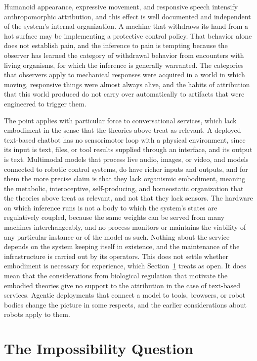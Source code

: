 \documentclass[12pt]{article}
\theoremstyle{definition}
\begin{document}
Humanoid appearance, expressive movement, and responsive speech intensify anthropomorphic attribution, and this effect is well documented and independent of the system's internal organization. A machine that withdraws its hand from a hot surface may be implementing a protective control policy. That behavior alone does not establish pain, and the inference to pain is tempting because the observer has learned the category of withdrawal behavior from encounters with living organisms, for which the inference is generally warranted. The categories that observers apply to mechanical responses were acquired in a world in which moving, responsive things were almost always alive, and the habits of attribution that this world produced do not carry over automatically to artifacts that were engineered to trigger them.

The point applies with particular force to conversational services, which lack embodiment in the sense that the theories above treat as relevant. A deployed text-based chatbot has no sensorimotor loop with a physical environment, since its input is text, files, or tool results supplied through an interface, and its output is text. Multimodal models that process live audio, images, or video, and models connected to robotic control systems, do have richer inputs and outputs, and for them the more precise claim is that they lack organismic embodiment, meaning the metabolic, interoceptive, self-producing, and homeostatic organization that the theories above treat as relevant, and not that they lack sensors. The hardware on which inference runs is not a body to which the system's states are regulatively coupled, because the same weights can be served from many machines interchangeably, and no process monitors or maintains the viability of any particular instance or of the model as such. Nothing about the service depends on the system keeping itself in existence, and the maintenance of the infrastructure is carried out by its operators. This does not settle whether embodiment is necessary for experience, which Section~\ref{sec:impossibility} treats as open. It does mean that the considerations from biological regulation that motivate the embodied theories give no support to the attribution in the case of text-based services. Agentic deployments that connect a model to tools, browsers, or robot bodies change the picture in some respects, and the earlier considerations about robots apply to them.

\section{The Impossibility Question}
\label{sec:impossibility}
\end{document}
